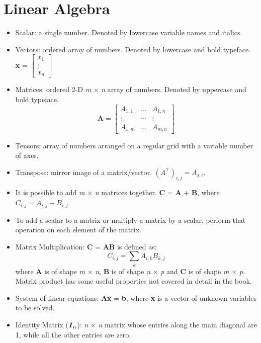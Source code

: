 \documentclass{article}
\begin{document}
\section{Linear Algebra}
\begin{itemize}
\item Scalar: a single number. Denoted by lowercase variable names and italics.
\item Vectors: ordered array of numbers. Denoted by lowercase and bold typeface. 
\textbf{x} = \(	
	\begin{bmatrix}
		\textit{x}_1 \\ 
    	\vdots \\ 
    	\textit{x}_n 
	\end{bmatrix}
\)
\item Matrices: ordered 2-D \textit{m} \(\times\) \textit{n} array of numbers. Denoted by uppercase and bold typeface.
\[ \textbf{A} = 
	\begin{bmatrix}
    	\textit{A}_{1,1} & \dots & \textit{A}_{1,n}\\ 
    	\vdots & \cdots & \vdots \\ 
    	\textit{A}_{1,m} & \dots & \textit{A}_{m,n} 
	\end{bmatrix}  
\]
\item Tensors: array of numbers arranged on a regular grid with a variable number of axes.
\item Transpose: mirror image of a matrix/vector. \( (A^\top)_{i,j} = A_{j,i} \).
\item It is possible to add \textit{m} \(\times\) \textit{n} matrices together. \textbf{C} = \textbf{A} + \textbf{B}, where \( \textit{C}_{i,j} = \textit{A}_{i,j} + \textit{B}_{i,j} \).
\item To add a scalar to a matrix or multiply a matrix by a scalar, perform that operation on each element of the matrix.
\item Matrix Multiplication: \textbf{C} = \textbf{AB} is defined as: 
\[
	\textit{C}_{i,j} = \sum_{k} \textit{A}_{i,k}\textit{B}_{k, j}
\]
where \textbf{A} is of shape \textit{m} \(\times\) \textit{n}, \textbf{B} is of shape \textit{n} \(\times\) \textit{p} and \textbf{C} is of shape \textit{m} \(\times\) \textit{p}.\\Matrix product has some useful properties not covered in detail in the book.
\item System of linear equations: \textbf{Ax} = \textbf{b}, where \textbf{x} is a vector of unknown variables to be solved.
\item Identity Matrix (\(\textbf{\textit{I}}_n\)): \textit{n} \(\times\) \textit{n} matrix whose entries along the main diagonal are 1, while all the other entries are zero.

\end{itemize}
\end{document}
